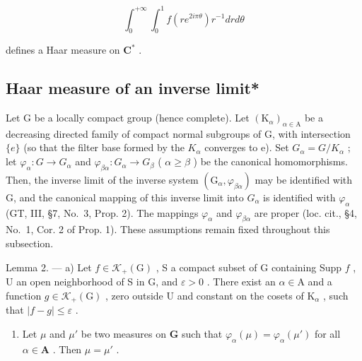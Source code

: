 \[
\int_ {0} ^ {+ \infty} \int_ {0} ^ {1} f (r e ^ {2 i \pi \theta}) r ^ {- 1} d r d \theta
\]

defines a Haar measure on \(\mathbf{C}^*\) .

\subsection{Haar measure of an inverse limit*}

Let G be a locally compact group (hence complete). Let \((\mathrm{K}_{\alpha})_{\alpha\in\mathrm{A}}\) be a decreasing directed family of compact normal subgroups of G, with intersection \(\{e\}\) (so that the filter base formed by the \(K_{\alpha}\) converges to e). Set \(G_{\alpha}=G/K_{\alpha}\) ; let \(\varphi_{\alpha}:G\to G_{\alpha}\) and \(\varphi_{\beta\alpha}:G_{\alpha}\to G_{\beta}\) ( \(\alpha\geqslant\beta\) ) be the canonical homomorphisms. Then, the inverse limit of the inverse system \((\mathrm{G}_{\alpha},\varphi_{\beta\alpha})\) may be identified with G, and the canonical mapping of this inverse limit into \(G_{\alpha}\) is identified with \(\varphi_{\alpha}\) (GT, III, §7, No.~3, Prop. 2). The mappings \(\varphi_{\alpha}\) and \(\varphi_{\beta\alpha}\) are proper (loc. cit., §4, No.~1, Cor. 2 of Prop. 1). These assumptions remain fixed throughout this subsection.

Lemma 2. --- a) Let \(f \in \mathcal{K}_{+}(\mathrm{G})\) , S a compact subset of G containing Supp \(f\) , U an open neighborhood of S in G, and \(\varepsilon > 0\) . There exist an \(\alpha \in \mathrm{A}\) and a function \(g \in \mathcal{K}_{+}(\mathrm{G})\) , zero outside U and constant on the cosets of \(\mathrm{K}_{\alpha}\) , such that \(|f - g| \leqslant \varepsilon\) .

\begin{enumerate}
\def\labelenumi{\alph{enumi})}
\setcounter{enumi}{1}
\tightlist
\item
  Let \(\mu\) and \(\mu'\) be two measures on \(\mathbf{G}\) such that \(\varphi_{\alpha}(\mu) = \varphi_{\alpha}(\mu')\) for all \(\alpha \in \mathbf{A}\) . Then \(\mu = \mu'\) .
\end{enumerate}


